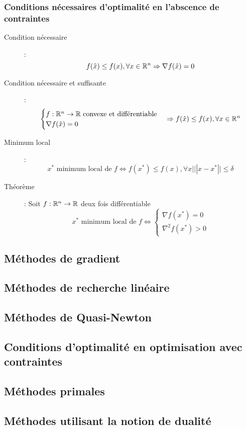 \subsubsection{Conditions nécessaires d'optimalité en l'abscence de contraintes}
\begin{description}
\item[Condition nécessaire] :
    \[
        f(\hat x)\le f(x),\forall x\in\mathbb{R}^n
        \Rightarrow
        \nabla f(\hat x) = 0
    \]
\item[Condition nécessaire et suffisante] : 
    \[
        \begin{cases}
            f:\mathbb{R}^n\rightarrow\mathbb{R}\textrm{ convexe et différentiable}\\
            \nabla f(\hat x) = 0
        \end{cases}
        \Rightarrow
        f(\hat x)\le f(x), \forall x\in\mathbb{R}^n
    \]
\item[Minimum local] : 
    \[
        x^*\textrm{ minimum local de }f\Leftrightarrow
        f(x^*)\le f(x), \forall x | ||x-x^*||\le\delta
    \]
\item[Théorème] : Soit $f:\mathbb{R}^n\rightarrow\mathbb{R}$ deux fois différentiable
    \[
        x^*\textrm{ minimum local de }f\Leftrightarrow
        \begin{cases}
            \nabla f(x^*) = 0\\
            \nabla^2f(x^*) > 0
        \end{cases}
    \]
\end{description}
\subsection{Méthodes de gradient}
\subsection{Méthodes de recherche linéaire}
\subsection{Méthodes de Quasi-Newton}
\subsection{Conditions d'optimalité en optimisation avec contraintes}
\subsection{Méthodes primales}
\subsection{Méthodes utilisant la notion de dualité}